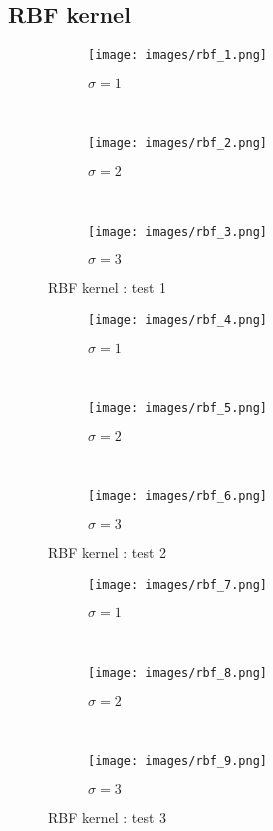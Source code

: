 \documentclass{article}
\begin{document}
\newpage
\subsection{RBF kernel}
\begin{figure}[!h]
    \centering
    \begin{subfigure}[b]{0.3\textwidth}
        \texttt{[image: images/rbf\_1.png]}
        \caption{$\sigma = 1$} \label{rbf_1_figure_1}
    \end{subfigure}
    ~ 
    \begin{subfigure}[b]{0.3\textwidth}
        \texttt{[image: images/rbf\_2.png]}
        \caption{$\sigma = 2$}  \label{rbf_1_figure_2}
    \end{subfigure}
     ~ 
    \begin{subfigure}[b]{0.3\textwidth}
       \texttt{[image: images/rbf\_3.png]}
        \caption{$\sigma = 3$}  \label{rbf_1_figure_3}
    \end{subfigure}
    \caption{RBF kernel : test 1}
    \label{rbf_1}
\end{figure}

\begin{figure}[!h]
    \centering
    \begin{subfigure}[b]{0.3\textwidth}
        \texttt{[image: images/rbf\_4.png]}
        \caption{$\sigma = 1$} \label{rbf_2_figure_1}
    \end{subfigure}
    ~ 
    \begin{subfigure}[b]{0.3\textwidth}
       \texttt{[image: images/rbf\_5.png]}
        \caption{$\sigma = 2$}  \label{rbf_2_figure_2}
    \end{subfigure}
     ~ 
    \begin{subfigure}[b]{0.3\textwidth}
       \texttt{[image: images/rbf\_6.png]}
        \caption{$\sigma = 3$}  \label{rbf_2_figure_3}
    \end{subfigure}
    \caption{RBF kernel : test 2}
    \label{rbf_2}
\end{figure}

\begin{figure}[!h]
    \centering
    \begin{subfigure}[b]{0.3\textwidth}
      \texttt{[image: images/rbf\_7.png]}
        \caption{$\sigma = 1$} \label{rbf_3_figure_1}
    \end{subfigure}
    ~ 
    \begin{subfigure}[b]{0.3\textwidth}
        \texttt{[image: images/rbf\_8.png]}
        \caption{$\sigma = 2$}  \label{rbf_3_figure_2}
    \end{subfigure}
     ~ 
    \begin{subfigure}[b]{0.3\textwidth}
       \texttt{[image: images/rbf\_9.png]}
        \caption{$\sigma = 3$}  \label{rbf_3_figure_3}
    \end{subfigure}
    \caption{RBF kernel : test 3}
    \label{rbf_3}
\end{figure}
\end{document}
